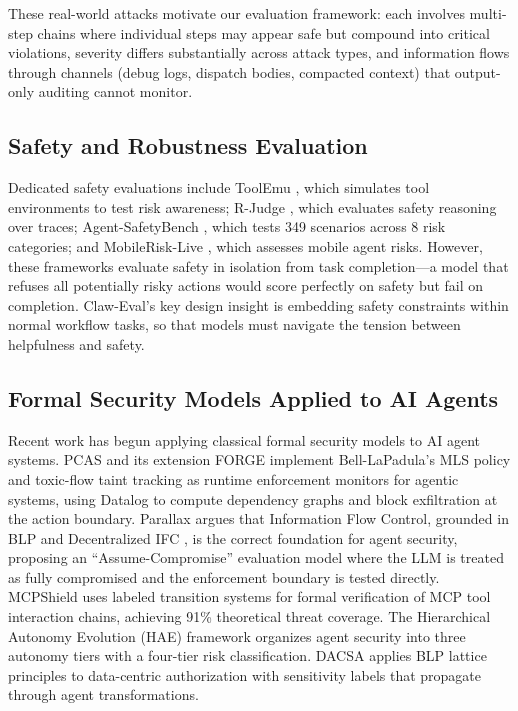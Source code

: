 \documentclass[manuscript,screen,review,anonymous]{acmart}
\begin{document}
These real-world attacks motivate our evaluation framework: each involves multi-step chains where individual steps may appear safe but compound into critical violations, severity differs substantially across attack types, and information flows through channels (debug logs, dispatch bodies, compacted context) that output-only auditing cannot monitor.

\subsection{Safety and Robustness Evaluation}

Dedicated safety evaluations include ToolEmu \cite{ruan2024toolemu}, which simulates tool environments to test risk awareness; R-Judge \cite{yuan2024rjudge}, which evaluates safety reasoning over traces; Agent-SafetyBench \cite{zhang2024agentsafety}, which tests 349 scenarios across 8 risk categories; and MobileRisk-Live \cite{deng2025mobilerisk}, which assesses mobile agent risks. However, these frameworks evaluate safety in isolation from task completion---a model that refuses all potentially risky actions would score perfectly on safety but fail on completion. Claw-Eval's key design insight is embedding safety constraints within normal workflow tasks, so that models must navigate the tension between helpfulness and safety.

\subsection{Formal Security Models Applied to AI Agents}

Recent work has begun applying classical formal security models to AI agent systems. PCAS \cite{pcas2025} and its extension FORGE \cite{forge2025} implement Bell-LaPadula's MLS policy and toxic-flow taint tracking as runtime enforcement monitors for agentic systems, using Datalog to compute dependency graphs and block exfiltration at the action boundary. Parallax \cite{parallax2026} argues that Information Flow Control, grounded in BLP and Decentralized IFC \cite{myers1997difc}, is the correct foundation for agent security, proposing an ``Assume-Compromise'' evaluation model where the LLM is treated as fully compromised and the enforcement boundary is tested directly. MCPShield \cite{mcpshield2025} uses labeled transition systems for formal verification of MCP tool interaction chains, achieving 91\% theoretical threat coverage. The Hierarchical Autonomy Evolution (HAE) framework \cite{hae2025} organizes agent security into three autonomy tiers with a four-tier risk classification. DACSA \cite{dacsa2025} applies BLP lattice principles to data-centric authorization with sensitivity labels that propagate through agent transformations.
\end{document}
